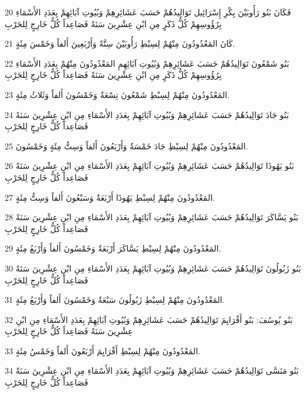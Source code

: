 \par 20 فَكَانَ بَنُو رَأُوبَيْنَ بِكْرِ إِسْرَائِيل تَوَالِيدُهُمْ حَسَبَ عَشَائِرِهِمْ وَبُيُوتِ آبَائِهِمْ بِعَدَدِ الأَسْمَاءِ بِرُؤُوسِهِمْ كُلُّ ذَكَرٍ مِنِ ابْنِ عِشْرِينَ سَنَةً فَصَاعِداً كُلُّ خَارِجٍ لِلحَرْبِ
\par 21 كَانَ المَعْدُودُونَ مِنْهُمْ لِسِبْطِ رَأُوبَيْنَ سِتَّةً وَأَرْبَعِينَ أَلفاً وَخَمْسَ مِئَةٍ.
\par 22 بَنُو شَمْعُونَ تَوَالِيدُهُمْ حَسَبَ عَشَائِرِهِمْ وَبُيُوتِ آبَائِهِمِ المَعْدُودُونَ مِنْهُمْ بِعَدَدِ الأَسْمَاءِ بِرُؤُوسِهِمْ كُلُّ ذَكَرٍ مِنِ ابْنِ عِشْرِينَ سَنَةً فَصَاعِداً كُلُّ خَارِجٍ لِلحَرْبِ
\par 23 المَعْدُودُونَ مِنْهُمْ لِسِبْطِ شَمْعُونَ تِسْعَةٌ وَخَمْسُونَ أَلفاً وَثَلاثُ مِئَةٍ.
\par 24 بَنُو جَادَ تَوَالِيدُهُمْ حَسَبَ عَشَائِرِهِمْ وَبُيُوتِ آبَائِهِمْ بِعَدَدِ الأَسْمَاءِ مِنِ ابْنِ عِشْرِينَ سَنَةً فَصَاعِداً كُلُّ خَارِجٍ لِلحَرْبِ
\par 25 المَعْدُودُونَ مِنْهُمْ لِسِبْطِ جَادَ خَمْسَةٌ وَأَرْبَعُونَ أَلفاً وَسِتُّ مِئَةٍ وَخَمْسُونَ.
\par 26 بَنُو يَهُوذَا تَوَالِيدُهُمْ حَسَبَ عَشَائِرِهِمْ وَبُيُوتِ آبَائِهِمْ بِعَدَدِ الأَسْمَاءِ مِنِ ابْنِ عِشْرِينَ سَنَةً فَصَاعِداً كُلُّ خَارِجٍ لِلحَرْبِ
\par 27 المَعْدُودُونَ مِنْهُمْ لِسِبْطِ يَهُوذَا أَرْبَعَةٌ وَسَبْعُونَ أَلفاً وَسِتُّ مِئَةٍ.
\par 28 بَنُو يَسَّاكَرَ تَوَالِيدُهُمْ حَسَبَ عَشَائِرِهِمْ وَبُيُوتِ آبَائِهِمْ بِعَدَدِ الأَسْمَاءِ مِنِ ابْنِ عِشْرِينَ سَنَةً فَصَاعِداً كُلُّ خَارِجٍ لِلحَرْبِ
\par 29 المَعْدُودُونَ مِنْهُمْ لِسِبْطِ يَسَّاكَرَ أَرْبَعَةٌ وَخَمْسُونَ أَلفاً وَأَرْبَعُ مِئَةٍ.
\par 30 بَنُو زَبُولُونَ تَوَالِيدُهُمْ حَسَبَ عَشَائِرِهِمْ وَبُيُوتِ آبَائِهِمْ بِعَدَدِ الأَسْمَاءِ مِنِ ابْنِ عِشْرِينَ سَنَةً فَصَاعِداً كُلُّ خَارِجٍ لِلحَرْبِ
\par 31 المَعْدُودُونَ مِنْهُمْ لِسِبْطِ زَبُولُونَ سَبْعَةٌ وَخَمْسُونَ أَلفاً وَأَرْبَعُ مِئَةٍ.
\par 32 بَنُو يُوسُفَ: بَنُو أَفْرَايِمَ تَوَالِيدُهُمْ حَسَبَ عَشَائِرِهِمْ وَبُيُوتِ آبَائِهِمْ بِعَدَدِ الأَسْمَاءِ مِنِ ابْنِ عِشْرِينَ سَنَةً فَصَاعِداً كُلُّ خَارِجٍ لِلحَرْبِ
\par 33 المَعْدُودُونَ مِنْهُمْ لِسِبْطِ أَفْرَايِمَ أَرْبَعُونَ أَلفاً وَخَمْسُ مِئَةٍ.
\par 34 بَنُو مَنَسَّى تَوَالِيدُهُمْ حَسَبَ عَشَائِرِهِمْ وَبُيُوتِ آبَائِهِمْ بِعَدَدِ الأَسْمَاءِ مِنِ ابْنِ عِشْرِينَ سَنَةً فَصَاعِداً كُلُّ خَارِجٍ لِلحَرْبِ
